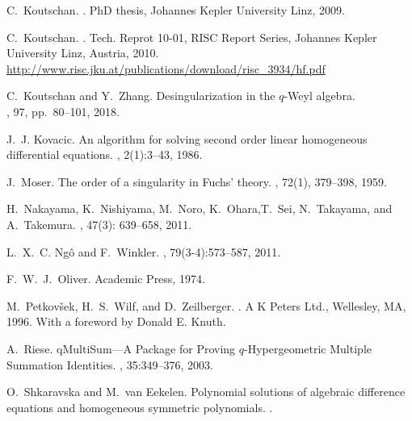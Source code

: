 \documentclass[10pt,a4paper]{article}
\begin{document}
\begin{thebibliography}{10}
C.~Koutschan.
.
\newblock PhD thesis, Johannes Kepler University Linz, 2009.

C.~Koutschan.
.
\newblock Tech. Reprot 10-01, RISC Report Series, Johannes Kepler University Linz, Austria, 2010. \\
\href{http://www.risc.jku.at/publications/download/risc_3934/hf.pdf}{http:/$\!$/www.risc.jku.at/publications/download/risc\_3934/hf.pdf}


C.~Koutschan and Y.~Zhang.
\newblock Desingularization in the $q$-Weyl algebra. \\
, 97, pp.\ 80–101, 2018. 

J.~J. Kovacic.
\newblock An algorithm for solving second order linear homogeneous differential
  equations.
, 2(1):3--43, 1986.

J.~Moser. 
\newblock The order of a singularity in Fuchs' theory.
, 72(1), 379--398, 1959.

H.~Nakayama, K.~Nishiyama, M.~Noro, K.~Ohara,T.~Sei, N.~Takayama, and A.~Takemura.
, 47(3): 639--658, 2011. 

L.~X.~C. {Ng\^o} and F.~Winkler.
, 79(3-4):573--587, 2011.

F.~W.~J.~Oliver.
\newblock Academic Press, 1974.

M.~Petkov{\v{s}}ek, H.~S.~Wilf, and D.~Zeilberger.
.
\newblock A K Peters Ltd., Wellesley, MA, 1996.
\newblock With a foreword by Donald E. Knuth.

A.~Riese.
\newblock qMultiSum---A Package for Proving $q$-Hypergeometric Multiple Summation Identities.
, 35:349--376, 2003.


O.~Shkaravska and M.~van Eekelen.
\newblock Polynomial solutions of algebraic difference equations and
  homogeneous symmetric polynomials.
.


\end{thebibliography}
\end{document}
